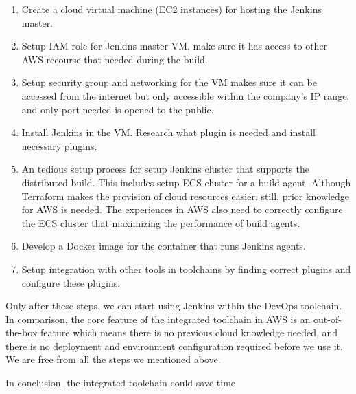 \begin{enumerate} 
 \item Create a cloud virtual machine (EC2 instances) for hosting the Jenkins master.
 \item Setup IAM role for Jenkins master VM, make sure it has access to other AWS recourse that needed during the build.
 \item Setup security group and networking for the VM makes sure it can be accessed from the internet but only accessible within the company's IP range, and only port needed is opened to the public.
 \item Install Jenkins in the VM. Research what plugin is needed and install necessary plugins.
 \item An tedious setup process for setup Jenkins cluster that supports the distributed build. This includes setup ECS cluster for a build agent. Although Terraform makes the provision of cloud resources easier, still, prior knowledge for AWS is needed. The experiences in AWS also need to correctly configure the ECS cluster that maximizing the performance of build agents.
 \item Develop a Docker image for the container that runs Jenkins agents.
 \item Setup integration with other tools in toolchains by finding correct plugins and configure these plugins. 
\end{enumerate}
Only after these steps, we can start using Jenkins within the DevOps toolchain.
In comparison, the core feature of the integrated toolchain in AWS is an out-of-the-box feature which means there is no previous cloud knowledge needed, and there is no deployment and environment configuration required before we use it. We are free from all the steps we mentioned above. 
\par
In conclusion, the integrated toolchain could save time
